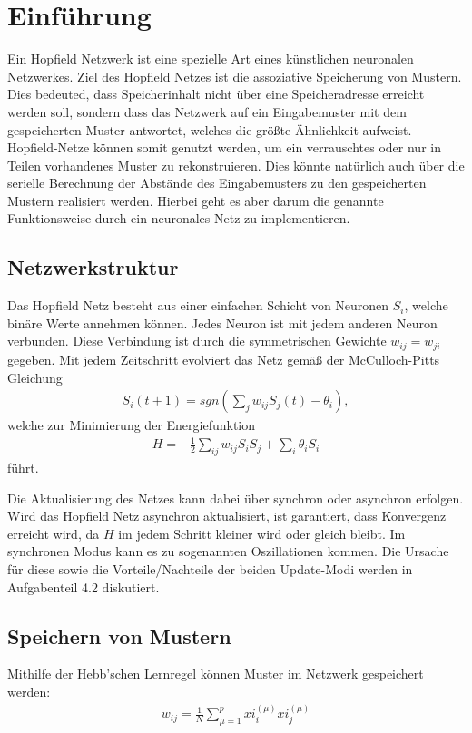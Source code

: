 \section{Einführung}
Ein Hopfield Netzwerk ist eine spezielle Art eines künstlichen neuronalen Netzwerkes. Ziel des Hopfield Netzes ist die assoziative Speicherung von Mustern. Dies bedeuted, dass Speicherinhalt nicht über eine Speicheradresse erreicht werden soll, sondern dass das Netzwerk auf ein Eingabemuster mit dem gespeicherten Muster antwortet, welches die größte Ähnlichkeit aufweist. Hopfield-Netze können somit genutzt werden, um ein verrauschtes oder nur in Teilen vorhandenes Muster zu rekonstruieren. Dies könnte natürlich auch über die serielle Berechnung der Abstände des Eingabemusters zu den gespeicherten Mustern realisiert werden. Hierbei geht es aber darum die genannte Funktionsweise durch ein neuronales Netz zu implementieren.

\subsection{Netzwerkstruktur}
Das Hopfield Netz besteht aus einer einfachen Schicht von Neuronen $S_i$, welche binäre Werte annehmen können. Jedes Neuron ist mit jedem anderen Neuron verbunden. Diese Verbindung ist durch die symmetrischen Gewichte $w_{ij} = w_{ji}$ gegeben. Mit jedem Zeitschritt evolviert das Netz gemäß der McCulloch-Pitts Gleichung
\begin{align}
S_i(t+1) =  sgn(\sum_j w_{ij} S_j(t) - \theta_i) ,
\end{align}
welche zur Minimierung der Energiefunktion
\begin{align}
H = - \frac{1}{2} \sum_{ij} w_{ij} S_i S_j + \sum_{i} \theta_i S_i
\end{align}
führt.

Die Aktualisierung des Netzes kann dabei über synchron oder asynchron erfolgen. Wird das Hopfield Netz asynchron aktualisiert, ist garantiert, dass Konvergenz erreicht wird, da $H$ im jedem Schritt kleiner wird oder gleich bleibt. Im synchronen Modus kann es zu sogenannten Oszillationen kommen. Die Ursache für diese sowie die Vorteile/Nachteile der beiden Update-Modi werden in Aufgabenteil 4.2 diskutiert.

\subsection{Speichern von Mustern}
Mithilfe der Hebb'schen Lernregel können Muster im Netzwerk gespeichert werden:
\begin{align}
w_{ij} = \frac{1}{N}\sum_{\mu = 1}^{p} xi_i^{(\mu)} xi_j^{(\mu)}
\end{align}

